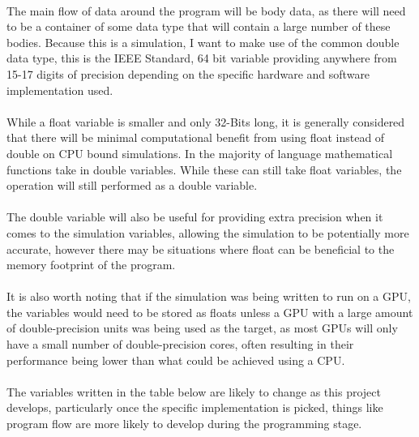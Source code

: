 \paragraph{}
The main flow of data around the program will be body data, as there will need to be a container of some data type that will contain a large number of these bodies. Because this is a simulation, I want to make use of the common double data type, this is the IEEE Standard, 64 bit variable providing anywhere from 15-17 digits of precision depending on the specific hardware and software implementation used.

\paragraph{} 
While a float variable is smaller and only 32-Bits long, it is generally considered that there will be minimal computational benefit from using float instead of double on CPU bound simulations. In the majority of language mathematical functions take in double variables. While these can still take float variables, the operation will still performed as a double variable.

\paragraph{}
The double variable will also be useful for providing extra precision when it comes to the simulation variables, allowing the simulation to be potentially more accurate, however there may be situations where float can be beneficial to the memory footprint of the program.

\paragraph{}
It is also worth noting that if the simulation was being written to run on a GPU, the variables would need to be stored as floats unless a GPU with a large amount of double-precision units was being used as the target, as most GPUs will only have a small number of double-precision cores, often resulting in their performance being lower than what could be achieved using a CPU.

\paragraph{}
The variables written in the table below are likely to change as this project develops, particularly once the specific implementation is picked, things like program flow are more likely to develop during the programming stage.

